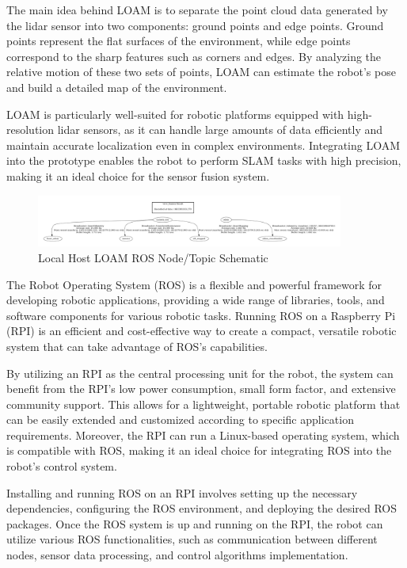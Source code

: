 \documentclass[12pt]{article}
\begin{document}
The main idea behind LOAM is to separate the point cloud data generated by the lidar sensor into two components: ground points and edge points. Ground points represent the flat surfaces of the environment, while edge points correspond to the sharp features such as corners and edges. By analyzing the relative motion of these two sets of points, LOAM can estimate the robot's pose and build a detailed map of the environment.

LOAM is particularly well-suited for robotic platforms equipped with high-resolution lidar sensors, as it can handle large amounts of data efficiently and maintain accurate localization even in complex environments. Integrating LOAM into the prototype enables the robot to perform SLAM tasks with high precision, making it an ideal choice for the sensor fusion system.

\begin{figure}[h]
    \centering
    \includegraphics[width=0.9\textwidth]{loam_ros_graph.png}
    \caption{Local Host LOAM ROS Node/Topic Schematic}
\end{figure}

The Robot Operating System (ROS) is a flexible and powerful framework for developing robotic applications, providing a wide range of libraries, tools, and software components for various robotic tasks. Running ROS on a Raspberry Pi (RPI) is an efficient and cost-effective way to create a compact, versatile robotic system that can take advantage of ROS's capabilities.

By utilizing an RPI as the central processing unit for the robot, the system can benefit from the RPI's low power consumption, small form factor, and extensive community support. This allows for a lightweight, portable robotic platform that can be easily extended and customized according to specific application requirements. Moreover, the RPI can run a Linux-based operating system, which is compatible with ROS, making it an ideal choice for integrating ROS into the robot's control system.

Installing and running ROS on an RPI involves setting up the necessary dependencies, configuring the ROS environment, and deploying the desired ROS packages. Once the ROS system is up and running on the RPI, the robot can utilize various ROS functionalities, such as communication between different nodes, sensor data processing, and control algorithms implementation.
\end{document}
